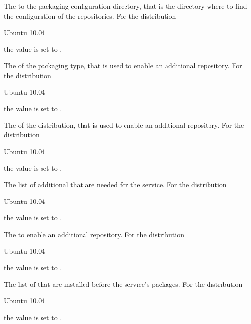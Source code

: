 The  to the packaging configuration directory, that is the directory
where to find the configuration of the repositories.
For the distribution
\begin{inparaitem}
\item[\TheDistribution{ubuntu}] Ubuntu 10.04
\end{inparaitem}
the value is set to .


The  of the packaging type, that is used to enable an additional
repository. For the distribution
\begin{inparaitem}
\item[\TheDistribution{ubuntu}] Ubuntu 10.04
\end{inparaitem}
the value is set to .


The  of the distribution, that is used to enable an additional
repository. For the distribution
\begin{inparaitem}
\item[\TheDistribution{ubuntu}] Ubuntu 10.04
\end{inparaitem}
the value is set to .


The list of additional  that are needed for the service. 
For the distribution
\begin{inparaitem}
\item[\TheDistribution{ubuntu}] Ubuntu 10.04
\end{inparaitem}
the value is set to .


The  to enable an additional repository.
For the distribution
\begin{inparaitem}
\item[\TheDistribution{ubuntu}] Ubuntu 10.04
\end{inparaitem}
the value is set to .


The list of  that are installed before the service's packages.
For the distribution
\begin{inparaitem}
\item[\TheDistribution{ubuntu}] Ubuntu 10.04
\end{inparaitem}
the value is set to .

